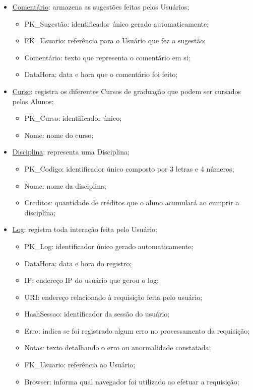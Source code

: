 \documentclass[graduacao,brazil]{ThesisPUC}
\begin{document}
\begin{itemize}
	\item \underline{Comentário}: armazena as sugestões feitas pelos Usuários;
	\begin{itemize}
		\item PK\_Sugestão: identificador único gerado automaticamente;
		\item FK\_Usuario: referência para o Usuário que fez a sugestão;
		\item Comentário: texto que representa o comentário em si;
		\item DataHora: data e hora que o comentário foi feito;
	\end{itemize}

	\item \underline{Curso}: registra os diferentes Cursos de graduação que podem ser cursados pelos Alunos;
	\begin{itemize}
		\item PK\_Curso: identificador único;
		\item Nome: nome do curso;
	\end{itemize}

	\item \underline{Disciplina}: representa uma Disciplina;
	\begin{itemize}
		\item PK\_Codigo: identificador único composto por 3 letras e 4 números;
		\item Nome: nome da disciplina;
		\item Creditos: quantidade de créditos que o aluno acumulará ao cumprir a disciplina;
	\end{itemize}

	\item \underline{Log}: registra toda interação feita pelo Usuário;
	\begin{itemize}
		\item PK\_Log: identificador único gerado automaticamente;
		\item DataHora: data e hora do registro;
		\item IP: endereço IP do usuário que gerou o log;
		\item URI: endereço relacionado à requisição feita pelo usuário;
		\item HashSessao: identificador da sessão do usuário;
		\item Erro: indica se foi registrado algum erro no processamento da requisição;
		\item Notas: texto detalhando o erro ou anormalidade constatada;
		\item FK\_Usuario: referência ao Usuário;
		\item Browser: informa qual navegador foi utilizado ao efetuar a requisição;
	\end{itemize}


\end{itemize}
\end{document}
